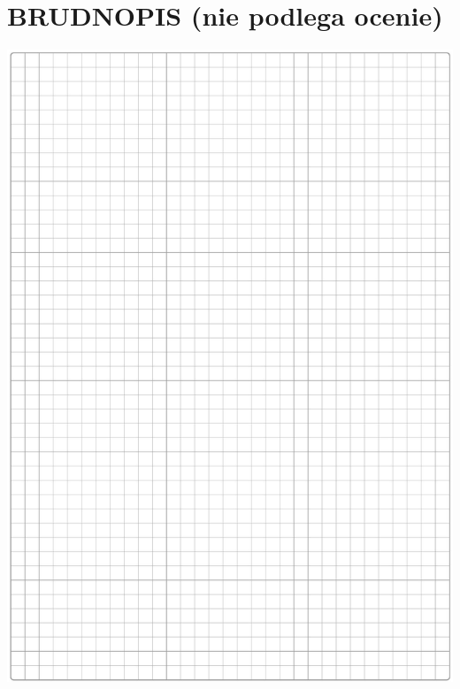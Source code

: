 \documentclass[10pt]{article}
\begin{document}
\section*{BRUDNOPIS (nie podlega ocenie)}
\begin{center}
\includegraphics[max width=\textwidth]{2024_11_21_6574e892c2387ce90f12g-03}
\end{center}
\end{document}
